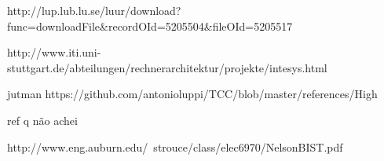 \begin{comment}
            Jà foi descrito o funcionamento nuclear de um ator Por sua simplicidade e também pelo seu compo estar descrito em seus ara representar este sistema, a representação será restrita aos diagramas de classe, e transição de estados.
            
            \subsection{Diagrama de estados}
            \subsection{Diagrama de sequências}
        \end{comment}
 \begin{comment}

                 \begin{figure}
                    \centering
                    \texttt{[image: board]}
                    \caption{foto do lado superior  do GT650}
                    \label{fig:board}
                \end{figure}
                
                \begin{figure}
                    \centering
                    \texttt{[image: board\_under]}
                    \caption{foto do lado inferior  do GT650}
                    \label{fig:board_inf}
                \end{figure}
            \end{comment} 
        
        

http://lup.lub.lu.se/luur/download?func=downloadFile&recordOId=5205504&fileOId=5205517

http://www.iti.uni-stuttgart.de/abteilungen/rechnerarchitektur/projekte/intesys.html

jutman
https://github.com/antonioluppi/TCC/blob/master/references/High%


ref q não achei 						
    
    http://www.eng.auburn.edu/~strouce/class/elec6970/NelsonBIST.pdf
    
